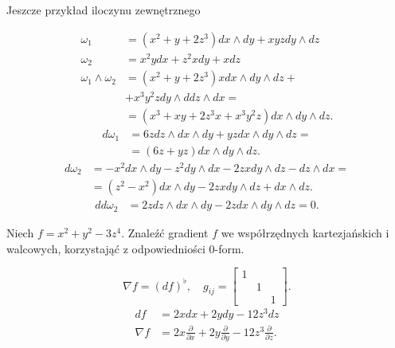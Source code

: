 \documentclass[../main.tex]{subfiles}
\begin{document}
\begin{cw}
    Jeszcze przykład iloczynu zewnętrznego
\end{cw}
\begin{align*}
    \omega_1 &= \left( x^2 + y + 2z^3 \right) dx\land dy + xyz dy\land dz\\
    \omega_2 &= x^2ydx + z^2xdy + xdz\\
    \omega_1 \land \omega_2 &= \left( x^2 + y + 2z^3\right)xdx\land dy\land dz +\\
    &+ x^3y^2zdy\land ddz\land dx =\\
    &= \left( x^3 + xy + 2z^3x + x^3y^2z \right) dx\land dy\land dz
.\end{align*}
\begin{align*}
    d\omega_1 &= 6zdz\land dx \land dy + yzdx\land dy\land dz =\\
    &= \left( 6z+yz \right) dx\land dy\land dz
.\end{align*}
\begin{align*}
    d\omega_2 &= -x^2 dx\land dy - z^2 dy\land dx - 2zxdy\land dz - dz\land dx =\\
    &= (z^2-x^2)dx\land dy - 2zxdy\land dz + dx\land dz
.\end{align*}
\begin{align*}
    dd\omega_2 &= 2zdz\land dx\land dy - 2zdx\land dy\land dz = 0
.\end{align*}
\begin{cw}
    Niech $f = x^2 + y^2 - 3z^4$. Znaleźć gradient $f$ we współrzędnych kartezjańskich i walcowych, korzystająć z odpowiedniości 0-form.
\end{cw}
\[
    \nabla f = (df)^\flat,\quad g_{ij} = \begin{bmatrix} 1&&\\&1&\\&&1 \end{bmatrix}
.\]
\begin{align*}
    df &= 2xdx + 2ydy - 12z^3dz\\
    \nabla f &= 2x \frac{\partial }{\partial x} + 2y \frac{\partial }{\partial y} - 12z^3 \frac{\partial }{\partial z}
.\end{align*}
\end{document}
